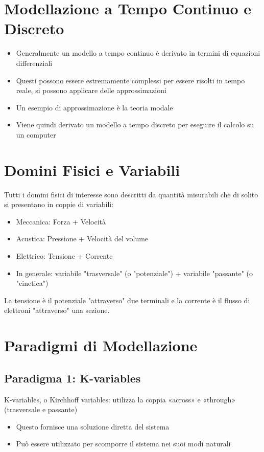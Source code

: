 \section{Modellazione a Tempo Continuo e Discreto}
\begin{itemize}
  \item Generalmente un modello a tempo continuo è derivato in termini di equazioni differenziali
  \item Questi possono essere estremamente complessi per essere risolti in tempo reale, si possono applicare delle approssimazioni
  \item Un esempio di approssimazione è la teoria modale
  \item Viene quindi derivato un modello a tempo discreto per eseguire il calcolo su un computer
\end{itemize}

\section{Domini Fisici e Variabili}
Tutti i domini fisici di interesse sono descritti da quantità misurabili che di solito si presentano in coppie di variabili:

\begin{itemize}
  \item Meccanica: Forza + Velocità
  \item Acustica: Pressione + Velocità del volume
  \item Elettrico: Tensione + Corrente
  \item In generale: variabile "trasversale" (o "potenziale") + variabile "passante" (o "cinetica")
\end{itemize}

La tensione è il potenziale "attraverso" due terminali e la corrente è il flusso di elettroni "attraverso" una sezione.

\section{Paradigmi di Modellazione}
\subsection{Paradigma 1: K-variables}
K-variables, o Kirchhoff variables: utilizza la coppia «across» e «through» (trasversale e passante)

\begin{itemize}
  \item Questo fornisce una soluzione diretta del sistema
  \item Può essere utilizzato per scomporre il sistema nei suoi modi naturali
\end{itemize}

